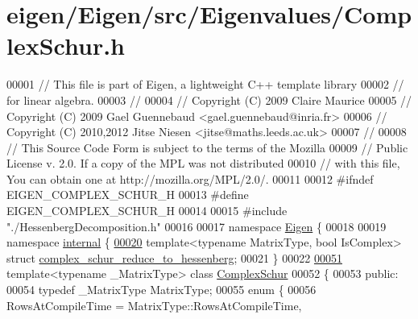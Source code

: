 \hypertarget{eigen_2_eigen_2src_2_eigenvalues_2_complex_schur_8h_source}{}\section{eigen/\+Eigen/src/\+Eigenvalues/\+Complex\+Schur.h}
\label{eigen_2_eigen_2src_2_eigenvalues_2_complex_schur_8h_source}

\begin{DoxyCode}
00001 \textcolor{comment}{// This file is part of Eigen, a lightweight C++ template library}
00002 \textcolor{comment}{// for linear algebra.}
00003 \textcolor{comment}{//}
00004 \textcolor{comment}{// Copyright (C) 2009 Claire Maurice}
00005 \textcolor{comment}{// Copyright (C) 2009 Gael Guennebaud <gael.guennebaud@inria.fr>}
00006 \textcolor{comment}{// Copyright (C) 2010,2012 Jitse Niesen <jitse@maths.leeds.ac.uk>}
00007 \textcolor{comment}{//}
00008 \textcolor{comment}{// This Source Code Form is subject to the terms of the Mozilla}
00009 \textcolor{comment}{// Public License v. 2.0. If a copy of the MPL was not distributed}
00010 \textcolor{comment}{// with this file, You can obtain one at http://mozilla.org/MPL/2.0/.}
00011 
00012 \textcolor{preprocessor}{#ifndef EIGEN\_COMPLEX\_SCHUR\_H}
00013 \textcolor{preprocessor}{#define EIGEN\_COMPLEX\_SCHUR\_H}
00014 
00015 \textcolor{preprocessor}{#include "./HessenbergDecomposition.h"}
00016 
00017 \textcolor{keyword}{namespace }\hyperlink{namespace_eigen}{Eigen} \{ 
00018 
00019 \textcolor{keyword}{namespace }\hyperlink{namespaceinternal}{internal} \{
\hyperlink{struct_eigen_1_1internal_1_1complex__schur__reduce__to__hessenberg}{00020} \textcolor{keyword}{template}<\textcolor{keyword}{typename} MatrixType, \textcolor{keywordtype}{bool} IsComplex> \textcolor{keyword}{struct }
      \hyperlink{struct_eigen_1_1internal_1_1complex__schur__reduce__to__hessenberg}{complex\_schur\_reduce\_to\_hessenberg};
00021 \}
00022 
\hyperlink{group___eigenvalues___module}{00051} \textcolor{keyword}{template}<\textcolor{keyword}{typename} \_MatrixType> \textcolor{keyword}{class }\hyperlink{group___eigenvalues___module_class_eigen_1_1_complex_schur}{ComplexSchur}
00052 \{
00053   \textcolor{keyword}{public}:
00054     \textcolor{keyword}{typedef} \_MatrixType MatrixType;
00055     \textcolor{keyword}{enum} \{
00056       RowsAtCompileTime = MatrixType::RowsAtCompileTime,

\end{DoxyCode}
